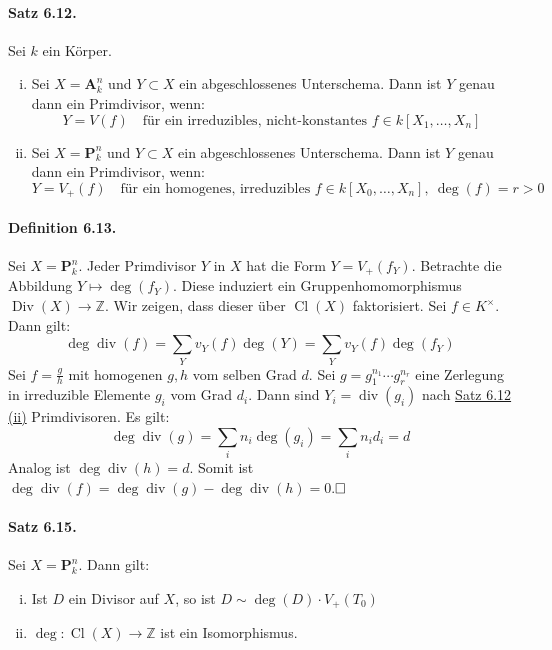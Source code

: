 \documentclass[11pt,b5paper,openany]{memoir}
\def \qed {$\hfill\square$}
\begin{document}
\paragraph{Satz 6.12.}\label{6.12} Sei $k$ ein Körper.
\begin{enumerate}[(i)]
\item Sei $X=\mathbf{A}_k^n$ und $Y\subset X$ ein abgeschlossenes Unterschema. Dann ist $Y$ genau dann ein Primdivisor, wenn:
\[Y=V(f)\quad\text{für ein irreduzibles, nicht-konstantes }f\in k[X_1,\ldots,X_n]  \]
\item Sei $X=\mathbf{P}_k^n$ und $Y\subset X$ ein abgeschlossenes Unterschema. Dann ist $Y$ genau dann ein Primdivisor, wenn:
\[Y=V_+(f)\quad\text{für ein homogenes, irreduzibles }f\in k[X_0,\ldots,X_n],\ \deg(f)=r>0 \]
\end{enumerate}

\paragraph{Definition 6.13.}\label{6.13} Sei $X=\mathbf{P}^n_k$. Jeder Primdivisor $Y$ in $X$ hat die Form $Y=V_+(f_Y)$. Betrachte die Abbildung $Y\mapsto\deg(f_Y)$. Diese induziert ein Gruppenhomomorphismus $\operatorname{Div}(X)\to\mathbb{Z}$. Wir zeigen, dass dieser über $\operatorname{Cl}(X)$ faktorisiert. Sei $f\in K^\times$. Dann gilt:
\[\deg\operatorname{div}(f)=\sum_Y v_Y(f) \deg(Y)=\sum_Y v_Y(f) \deg(f_Y) \]
Sei $f=\frac{g}{h}$ mit homogenen $g,h$ vom selben Grad $d$. Sei $g=g_1^{n_1}\cdots g_r^{n_r}$ eine Zerlegung in irreduzible Elemente $g_i$ vom Grad $d_i$. Dann sind $Y_i=\operatorname{div}(g_i)$ nach \hyperref[6.12]{Satz 6.12 (ii)} Primdivisoren. Es gilt:
\[\deg\operatorname{div}(g)=\sum_i n_i\deg(g_i) = \sum_i n_id_i = d \]
Analog ist $\deg\operatorname{div}(h)=d$. Somit ist $\deg\operatorname{div}(f)=\deg\operatorname{div}(g)-\deg\operatorname{div}(h)=0$.\qed

\paragraph{Satz 6.15.}\label{6.15} Sei $X=\mathbf{P}_k^n$. Dann gilt:
\begin{enumerate}[(i)]
\item Ist $D$ ein Divisor auf $X$, so ist $D\sim\deg(D)\cdot V_+(T_0)$
\item $\deg:\operatorname{Cl}(X)\to\mathbb{Z}$ ist ein Isomorphismus.
\end{enumerate}
\end{document}
